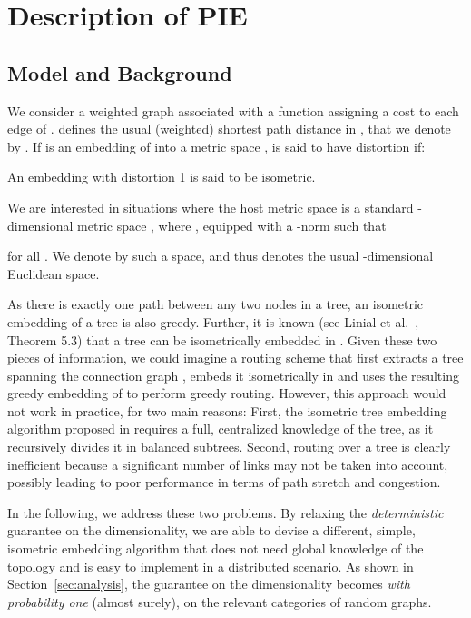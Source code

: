 \documentclass[conference]{IEEEtran}
\begin{document}
\section{Description of PIE}
\label{sec:pie}

\subsection{Model and Background}
\label{sec:bm}
We consider a weighted graph  associated with a function  assigning a cost to each edge of .  defines the usual (weighted) shortest path distance in , that we denote by . If  is an embedding of  into a metric space ,  is said to have distortion  if: 
 
An embedding with distortion 1 is said to be isometric.

We are interested in situations where the host metric space is a standard -dimensional metric space , where , equipped with a -norm such that 

for all . We denote by  such a space, and thus  denotes the usual -dimensional Euclidean space.




As there is exactly one path between any two nodes in a tree, an isometric embedding of a tree is also greedy.
Further, it is known (see Linial et al.\ \cite{linial}, Theorem 5.3) that a tree can be isometrically embedded in . Given these two pieces of information, we could imagine a routing scheme that first extracts a tree  spanning the connection graph , embeds it isometrically in  and uses the resulting greedy embedding of  to perform greedy routing. However, this approach would not work in practice, for two main reasons: 
First, the isometric tree embedding algorithm proposed in \cite{linial} requires a full, centralized knowledge of the tree, as it recursively divides it in balanced subtrees. Second, routing over a tree is clearly inefficient because a significant number of links may not be taken into account, possibly leading to poor performance in terms of path stretch and congestion.

In the following, we address these two problems. 
By relaxing the \emph{deterministic} guarantee on the dimensionality, we are able to devise a different, simple, isometric embedding algorithm that does not need global knowledge of the topology and is easy to implement in a distributed scenario. As shown in Section~\ref{sec:analysis}, the guarantee on the dimensionality becomes  \emph{with probability one} (almost surely), on the relevant categories of random graphs.
\end{document}

